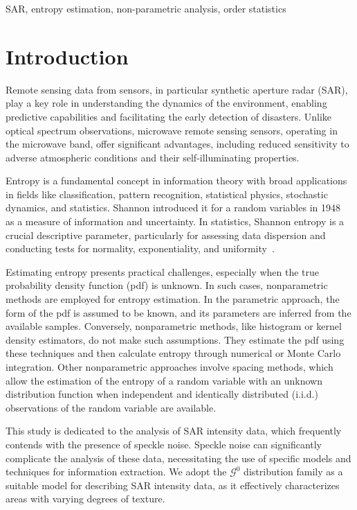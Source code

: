 \documentclass[conference]{IEEEtran}
\begin{document}
\begin{IEEEkeywords}
SAR, entropy estimation, non-parametric analysis, order statistics
\end{IEEEkeywords}

\section{Introduction}\label{sec_01}

Remote sensing data from sensors, in particular synthetic aperture radar (SAR), play a key role in understanding the dynamics of the environment, enabling predictive capabilities and facilitating the early detection of disasters. Unlike optical spectrum observations, microwave remote sensing sensors, operating in the microwave band, offer significant advantages, including reduced sensitivity to adverse atmospheric conditions and their self-illuminating properties.

Entropy is a fundamental concept in information theory with broad applications in fields like classification, pattern recognition, statistical physics, stochastic dynamics, and statistics.
Shannon introduced it for a random variables in 1948~\cite{Shannon1948} as a measure of information and uncertainty. 
In statistics, Shannon entropy is a crucial descriptive parameter, particularly for assessing data dispersion and conducting tests for normality, exponentiality, and uniformity~\cite{Wieczorkowski1999}.

Estimating entropy presents practical challenges, especially when the true probability density function (pdf) is unknown.
In such cases, nonparametric methods are employed for entropy estimation. 
In the parametric approach, the form of the pdf is assumed to be known, and its parameters are inferred from the available samples. 
Conversely, nonparametric methods, like histogram or kernel density estimators, do not make such assumptions. 
They estimate the pdf using these techniques and then calculate entropy through numerical or Monte Carlo integration. 
Other nonparametric approaches involve spacing methods, which allow the estimation of the entropy of a random variable with an unknown distribution function when independent and identically distributed (i.i.d.) observations of the random variable are available.


This study is dedicated to the analysis of SAR intensity data, which frequently contends with the presence of speckle noise. 
Speckle noise can significantly complicate the analysis of these data, necessitating the use of specific models and techniques for information extraction. 
We adopt the $\mathcal G^0$ distribution family as a suitable model for describing SAR intensity data, as it effectively characterizes areas with varying degrees of texture.
\end{document}
